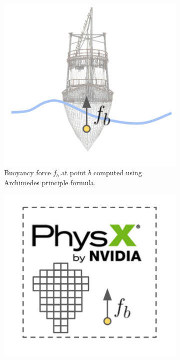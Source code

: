 \documentclass{report}
\begin{document}
\begin{figure}[htb]
\medskip
\begin{subfigure}{0.25\textwidth}
  \includegraphics[width=\linewidth]{images/ship_algo_4.pdf}
  \caption{Buoyancy force $f_b$ at point $b$ computed using Archimedes principle formula.}
  \label{fig:ship_algo_4}
\end{subfigure}\hfil %
\begin{subfigure}{0.25\textwidth}
  \includegraphics[width=\linewidth]{images/ship_algo_5.pdf}

\end{subfigure}
\end{figure}
\end{document}
